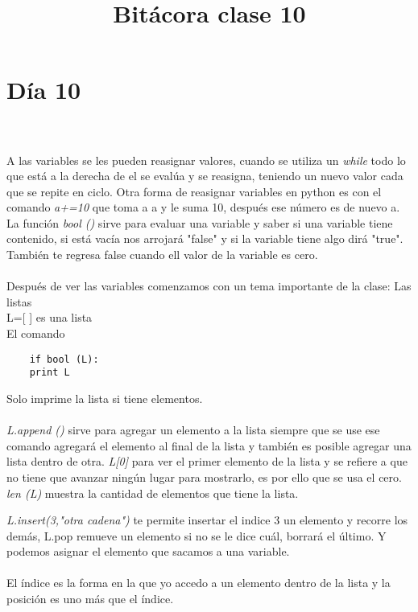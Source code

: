 \documentclass{book}
\begin{document}
	
	\section{Día 10}
	\title{\Huge Bitácora clase 10} \\
	\\
	
	A las variables se les pueden reasignar valores, cuando se utiliza un \textit{while} todo lo que está a la derecha de el se evalúa y se reasigna, teniendo un nuevo valor cada que se repite en ciclo. Otra forma de reasignar variables en python es con el comando \textit{a+=10} que toma a a y le suma 10, después ese número es de nuevo a. La función \textit{bool ()} sirve para evaluar una variable y saber si una variable tiene contenido, si está vacía nos arrojará "false" y si la variable tiene algo dirá "true". También te regresa false cuando ell valor de la variable es cero.\\
	\\Después de ver las variables comenzamos con un tema importante de la clase: Las listas\\
	L=[ ] es una lista\\
	El comando \begin{verbatim}
	if bool (L):
	print L 
	\end{verbatim}
	Solo imprime la lista si tiene elementos.\\
	\\
	
	\textit{L.append ()} sirve para agregar un elemento a la lista siempre que se use ese comando agregará el elemento al final de la lista y también es posible agregar una lista dentro de otra. \textit{L[0]} para ver el primer elemento de la lista y se refiere a que no tiene que avanzar ningún lugar para mostrarlo, es por ello que se usa el cero. \textit{len (L)} muestra la cantidad de elementos que tiene la lista. 
	
	\textit{L.insert(3,"otra cadena")} te permite insertar el  indice 3 un elemento y recorre los demás,  L.pop remueve un elemento si no se le dice cuál, borrará el último. Y podemos asignar el elemento que sacamos a una variable.\\
	\\
	
	El índice es la forma en la que yo accedo a un elemento dentro de la lista y la posición es uno más que el índice.\\
	
\end{document}
